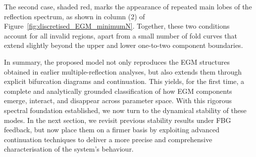 The second case, shaded red, marks the appearance of repeated main lobes of the reflection spectrum, as shown in column (2) of Figure~\ref{fig:discretised_EGM_minimumN}.
Together, these two conditions account for all invalid regions, apart from a small number of fold curves that extend slightly beyond the upper and lower one-to-two component boundaries.
%
\par
%
In summary, the proposed model not only reproduces the EGM structures obtained in earlier multiple-reflection analyses, but also extends them through explicit bifurcation diagrams and continuation.
This yields, for the first time, a complete and analytically grounded classification of how EGM components emerge, interact, and disappear across parameter space.
With this rigorous spectral foundation established, we now turn to the dynamical stability of these modes.
In the next section, we revisit previous stability results under FBG feedback, but now place them on a firmer basis by exploiting advanced continuation techniques to deliver a more precise and comprehensive characterisation of the system’s behaviour.
%
%
